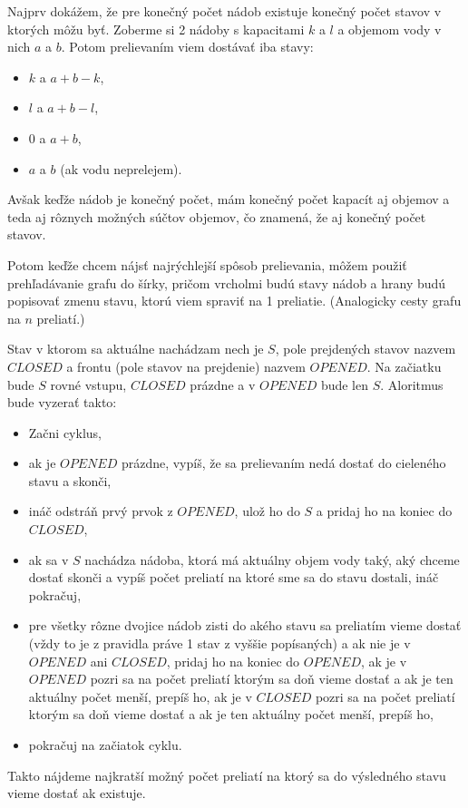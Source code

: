
Najprv dokážem, že pre konečný počet nádob existuje konečný počet 
stavov v ktorých môžu byť. Zoberme si 2 nádoby s kapacitami $k$ a $l$ a 
objemom vody v nich $a$ a $b$. Potom prelievaním viem dostávať iba stavy:
\begin{itemize}
    \item $k$ a $a+b-k$,
    \item $l$ a $a+b-l$,
    \item $0$ a $a+b$,
    \item $a$ a $b$ (ak vodu neprelejem).
\end{itemize}
Avšak keďže nádob je konečný počet, mám konečný počet kapacít aj objemov 
a teda aj rôznych možných súčtov objemov, čo znamená, že aj konečný 
počet stavov.

Potom keďže chcem nájsť najrýchlejší spôsob prelievania, môžem použiť 
prehľadávanie grafu do šírky, pričom vrcholmi budú stavy nádob a 
hrany budú popisovať zmenu stavu, ktorú viem spraviť na 1 preliatie.
(Analogicky cesty grafu na $n$ preliatí.)

Stav v ktorom sa aktuálne nachádzam nech je $S$, pole prejdených stavov 
nazvem $CLOSED$ a frontu (pole stavov na prejdenie) nazvem $OPENED$. 
Na začiatku bude $S$ rovné vstupu, $CLOSED$ prázdne a v $OPENED$ bude 
len $S$. Aloritmus bude vyzerať takto:
\begin{itemize}
    \item Začni cyklus, 
    \item ak je $OPENED$ prázdne, vypíš, že sa prelievaním nedá dostať 
    do cieleného stavu a skonči, 
    \item ináč odstráň prvý prvok z $OPENED$, ulož ho do $S$ a pridaj 
    ho na koniec do $CLOSED$, 
    \item ak sa v $S$ nachádza nádoba, ktorá má aktuálny objem vody taký, 
    aký chceme dostať skonči a vypíš počet preliatí na ktoré sme sa 
    do stavu dostali, ináč pokračuj, 
    \item pre všetky rôzne dvojice nádob zisti do akého stavu sa 
    preliatím vieme dostať (vždy to je z pravidla práve 1 stav z vyššie 
    popísaných) a ak nie je v $OPENED$ ani $CLOSED$, pridaj ho na koniec 
    do $OPENED$, ak je v $OPENED$ pozri sa na počet preliatí ktorým sa 
    doň vieme dostať a ak je ten aktuálny počet menší, prepíš ho, 
    ak je v $CLOSED$ pozri sa na počet preliatí ktorým sa 
    doň vieme dostať a ak je ten aktuálny počet menší, prepíš ho, 
    \item pokračuj na začiatok cyklu.
\end{itemize}
Takto nájdeme najkratší možný počet preliatí na ktorý sa do výsledného 
stavu vieme dostať ak existuje.

